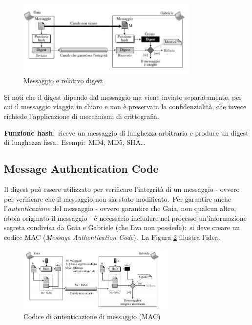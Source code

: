 \begin{figure}[H]
    \centering
    \includegraphics[width=0.8\textwidth]{immagini/Message_digest.png}
    \caption{Messaggio e relativo digest}
    \label{fig:digest}
\end{figure}

Si noti che il digest dipende dal messaggio ma viene inviato separatamente, per cui il messaggio viaggia in chiaro e non è preservata la confidenzialità, che invece richiede l'applicazione di meccanismi di crittografia.

\textbf{Funzione hash}:\ riceve un messaggio di lunghezza arbitraria e produce un digest di lunghezza fissa.\
Esempi:\ MD4, MD5, SHA\dots

\subsection{Message Authentication Code}

Il digest può essere utilizzato per verificare l'integrità di un messaggio - ovvero per verificare che il messaggio non sia stato modificato.\
Per garantire anche l'\textit{autenticazione} del messaggio - ovvero garantire che Gaia, non qualcun altro, abbia originato il messaggio - è necessario includere nel processo un'informazione segreta condivisa da Gaia e Gabriele (che Eva non possiede):\ si deve creare un codice MAC (\textit{Message Authentication Code}).\
La Figura \ref{fig:MAC} illustra l'idea.

\begin{figure}[H]
    \centering
    \includegraphics[width=0.7\textwidth]{immagini/MAC.jpg}
    \caption{Codice di autenticazione di messaggio (MAC)}
    \label{fig:MAC}
\end{figure}

